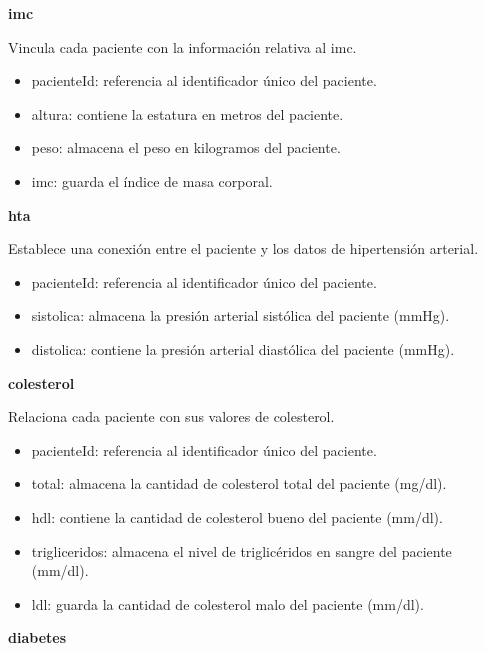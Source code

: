 \documentclass[11pt,spanish,
		listoftables,listoffigures]
		{tfgplantilla}
\begin{document}
\noindent
\textbf {imc}

Vincula cada paciente con la información relativa al imc.
\begin{itemize}
	\item pacienteId: referencia al identificador único del paciente.
	\item altura: contiene la estatura en metros del paciente.
	\item peso: almacena el peso en kilogramos del paciente.
	\item imc: guarda el índice de masa corporal.
\end{itemize}

\noindent
\textbf {hta}

Establece una conexión entre el paciente y los datos de hipertensión arterial.
\begin{itemize}
	\item pacienteId: referencia al identificador único del paciente.
	\item sistolica: almacena la presión arterial sistólica del paciente (mmHg).
	\item distolica: contiene la presión arterial diastólica del paciente (mmHg).
\end{itemize}

\noindent
\textbf {colesterol}

Relaciona cada paciente con sus valores de colesterol.
\begin{itemize}
	\item pacienteId: referencia al identificador único del paciente. 
	\item total: almacena la cantidad de colesterol total del paciente (mg/dl).
	\item hdl: contiene la cantidad de colesterol bueno del paciente (mm/dl).
	\item trigliceridos: almacena el nivel de triglicéridos en sangre del paciente (mm/dl).
	\item ldl: guarda la cantidad de colesterol malo del paciente (mm/dl).
\end{itemize}

\noindent
\textbf {diabetes}
\end{document}
